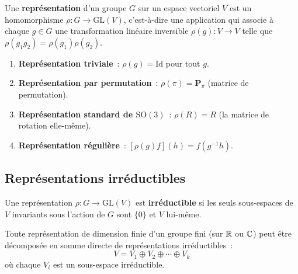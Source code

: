 \begin{definition}
Une \textbf{repr\'esentation} d'un groupe $G$ sur un espace vectoriel $V$ est
un homomorphisme $\rho: G \to \mathrm{GL}(V)$, c'est-\`a-dire une application
qui associe \`a chaque $g \in G$ une transformation lin\'eaire inversible
$\rho(g): V \to V$ telle que $\rho(g_1 g_2) = \rho(g_1)\rho(g_2)$.
\end{definition}

\begin{exemple}
\begin{enumerate}
    \item \textbf{Repr\'esentation triviale}~: $\rho(g) = \mathrm{Id}$ pour tout $g$.
    \item \textbf{Repr\'esentation par permutation}~: $\rho(\pi) = \mathbf{P}_\pi$
          (matrice de permutation).
    \item \textbf{Repr\'esentation standard de $\mathrm{SO}(3)$}~: $\rho(R) = R$
          (la matrice de rotation elle-m\^eme).
    \item \textbf{Repr\'esentation r\'eguli\`ere}~: $[\rho(g)f](h) = f(g^{-1}h)$.
\end{enumerate}
\end{exemple}

\subsection{Repr\'esentations irr\'eductibles}

\begin{definition}
Une repr\'esentation $\rho: G \to \mathrm{GL}(V)$ est \textbf{irr\'eductible}
si les seuls sous-espaces de $V$ invariants sous l'action de $G$ sont $\{0\}$
et $V$ lui-m\^eme.
\end{definition}

\begin{theoreme}
Toute repr\'esentation de dimension finie d'un groupe fini (sur $\mathbb{R}$ ou $\mathbb{C}$)
peut \^etre d\'ecompos\'ee en somme directe de repr\'esentations irr\'eductibles~:
\[
    V = V_1 \oplus V_2 \oplus \cdots \oplus V_k
\]
o\`u chaque $V_i$ est un sous-espace irr\'eductible.
\end{theoreme}

